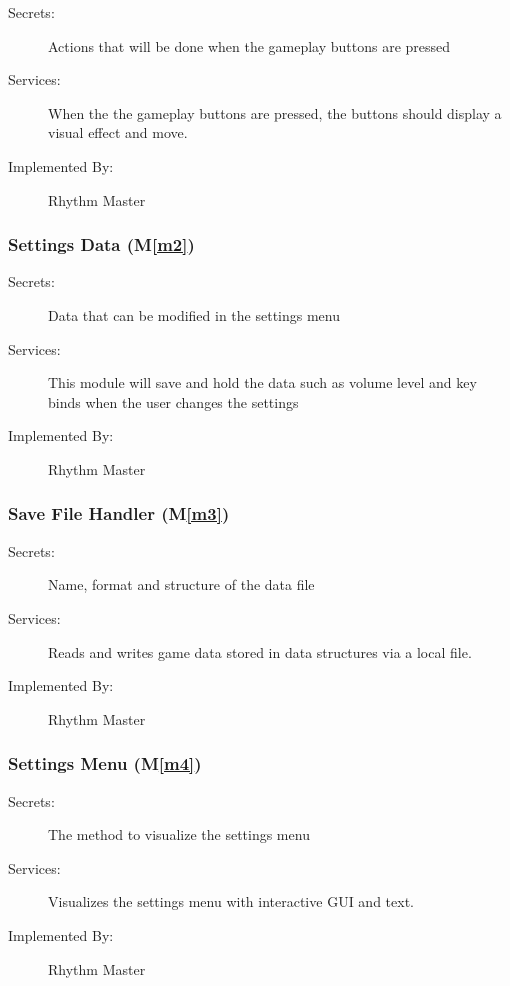 \documentclass[12pt, titlepage]{article}
\newcommand{\mref}[1]{M\ref{#1}}
\begin{document}
\begin{description}
\item[Secrets:]Actions that will be done when the gameplay buttons are pressed
\item[Services:]When the the gameplay buttons are pressed, the buttons should display a visual effect and move.
\item[Implemented By:] Rhythm Master
\end{description}

\subsubsection{Settings Data (\mref{m2})}

\begin{description}
\item[Secrets:]Data that can be modified in the settings menu
\item[Services:]This module will save and hold the data such as volume level and key binds when the user changes the settings
\item[Implemented By:] Rhythm Master
\end{description}

\subsubsection{Save File Handler (\mref{m3})}

\begin{description}
\item[Secrets:]Name, format and structure of the data file
\item[Services:]Reads and writes game data stored in data structures via a local file.
\item[Implemented By:] Rhythm Master
\end{description}

\subsubsection{Settings Menu (\mref{m4})}

\begin{description}
\item[Secrets:]The method to visualize the settings menu
\item[Services:]Visualizes the settings menu with interactive GUI and text.
\item[Implemented By:] Rhythm Master
\end{description}
\end{document}
